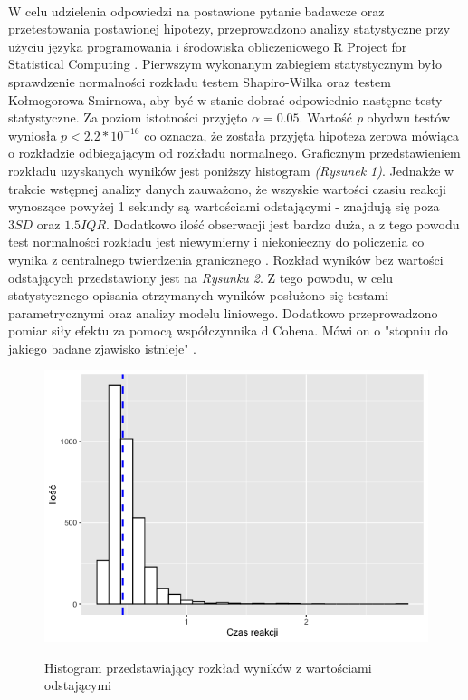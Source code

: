 \documentclass[12pt,a4paper,final,oneside,onecolumn,titlepage]{article}
\begin{document}
\paragraph{}
W celu udzielenia odpowiedzi na postawione pytanie badawcze oraz przetestowania postawionej hipotezy, przeprowadzono analizy statystyczne przy użyciu języka programowania i środowiska obliczeniowego R Project for Statistical Computing \citep{r_core_team_r_2022}. Pierwszym wykonanym zabiegiem statystycznym było sprawdzenie normalności rozkładu testem Shapiro-Wilka oraz testem Kołmogorowa-Smirnowa, aby być w stanie dobrać odpowiednio następne testy statystyczne. Za poziom istotności przyjęto $\alpha = 0.05$. Wartość \textit{p} obydwu testów wyniosła $p < 2.2*10^{-16}$ co oznacza, że została przyjęta hipoteza zerowa mówiąca o rozkładzie odbiegającym od rozkładu normalnego. Graficznym przedstawieniem rozkładu uzyskanych wyników jest poniższy histogram \textit{(Rysunek 1)}. Jednakże w trakcie wstępnej analizy danych zauważono, że wszyskie wartości czasiu reakcji wynoszące powyżej 1 sekundy są wartościami odstającymi - znajdują się poza $3SD$ oraz $1.5IQR$. Dodatkowo ilość obserwacji jest bardzo duża, a z tego powodu test normalności rozkładu jest niewymierny i niekonieczny do policzenia co wynika z centralnego twierdzenia granicznego \citep{kwak_central_2017}. Rozkład wyników bez wartości odstających przedstawiony jest na \textit{Rysunku 2}. Z tego powodu, w celu statystycznego opisania otrzymanych wyników posłużono się testami parametrycznymi oraz analizy modelu liniowego. Dodatkowo przeprowadzono pomiar siły efektu za pomocą współczynnika d Cohena. Mówi on o "stopniu do jakiego badane zjawisko istnieje" \citep[s. 5]{cohen_statistical_1977}. 
\begin{figure}[H]
\centering
\caption{Histogram przedstawiający rozkład wyników z wartościami odstającymi}
\includegraphics[scale=0.5]{hist1}
\label{Rysunek}
\end{figure}
\end{document}

